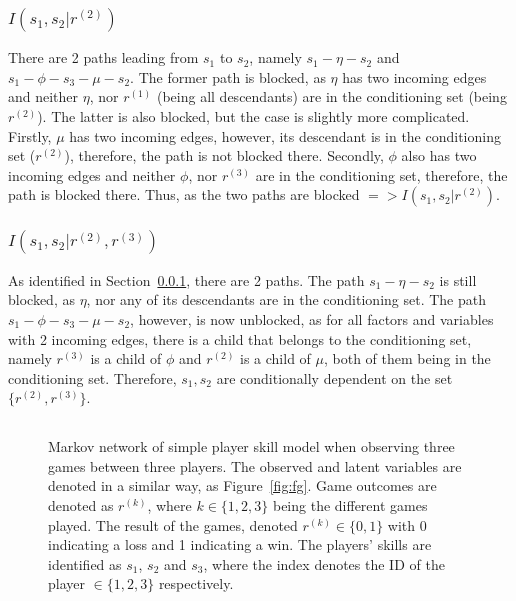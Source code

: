 \documentclass[a4paper,11pt]{article}
\theoremstyle{mytheor}
\begin{document}
\subsubsection{$I(s_1,s_2|r^{(2)})$}
\label{sec:first_indep}
There are 2 paths leading from $s_1$ to $s_2$, namely $s_1-\eta-s_2$ and $s_1-\phi-s_3-\mu-s_2$. The former path is blocked, as $\eta$ has two incoming edges and neither $\eta$, nor $r^{(1)}$ (being all descendants) are in the conditioning set (being $r^{(2)}$). The latter is also blocked, but the case is slightly more complicated. Firstly, $\mu$ has two incoming edges, however, its descendant is in the conditioning set ($r^{(2)}$), therefore, the path is not blocked there. Secondly, $\phi$ also has two incoming edges and neither $\phi$, nor $r^{(3)}$ are in the conditioning set, therefore, the path is blocked there.
Thus, as the two paths are blocked $=> I(s_1,s_2|r^{(2)})$.
\subsubsection{$I(s_1,s_2|r^{(2)},r^{(3)})$}
As identified in Section~\ref{sec:first_indep}, there are 2 paths. The path $s_1-\eta-s_2$ is still blocked, as $\eta$, nor any of its descendants are in the conditioning set. The path $s_1-\phi-s_3-\mu-s_2$, however, is now unblocked, as for all factors and variables with 2 incoming edges, there is a child that belongs to the conditioning set, namely $r^{(3)}$ is a child of $\phi$ and $r^{(2)}$ is a child of $\mu$, both of them being in the conditioning set. Therefore, $s_1,s_2$ are conditionally dependent on the set $\{r^{(2)},r^{(3)}\}$.
\subsection{}
\begin{figure}[htpb!]
    \centering
    \caption{Markov network of simple player skill model when observing three games between three players. The observed and latent variables are denoted in a similar way, as Figure~\ref{fig:fg}. Game outcomes are denoted as $r^{(k)}$, where $k\in{\{1,2,3\}}$ being the different games played. The result of the games, denoted $r^{(k)}\in{\{0,1\}}$ with 0 indicating a loss and 1 indicating a win. The players' skills are identified as $s_1$, $s_2$ and $s_3$, where the index denotes the ID of the player $\in{\{1,2,3\}}$ respectively.}
    \label{fig:mn}
\end{figure}
\end{document}
